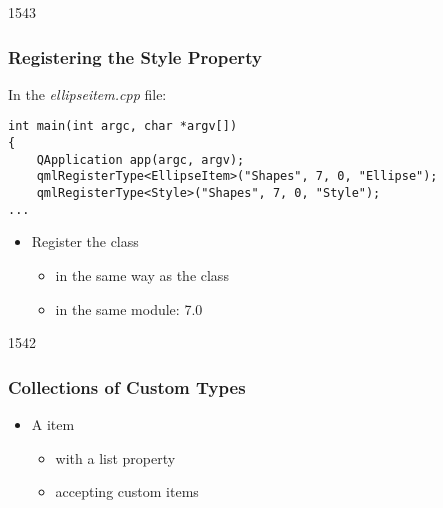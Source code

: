 \begin{slide}[fragile]{1543}\frametitle{Registering the Style Property}

In the \textit{ellipseitem.cpp} file:

\vspace*{0.5em}
\begin{lstlisting}
int main(int argc, char *argv[])
{
    QApplication app(argc, argv);
    qmlRegisterType<EllipseItem>("Shapes", 7, 0, "Ellipse");
    qmlRegisterType<Style>("Shapes", 7, 0, "Style");
...
\end{lstlisting}

\vspace*{1.0em}
\begin{itemize}
\item Register the  class
  \begin{itemize}
  \item in the same way as the  class
  \item in the same module:  7.0
  \end{itemize}
\end{itemize}

\end{slide}

\begin{slide}[fragile]{1542}\frametitle{Collections of Custom Types}


\begin{itemize}
\item A  item
  \begin{itemize}
  \item with a  list property
  \item accepting custom  items
  \end{itemize}
\end{itemize}

\end{slide}

